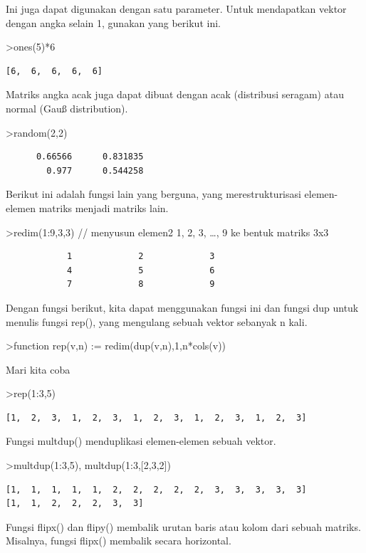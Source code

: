 \documentclass[
]{book}
\begin{document}
Ini juga dapat digunakan dengan satu parameter. Untuk mendapatkan vektor dengan angka selain 1, gunakan yang berikut ini.

\textgreater ones(5)*6

\begin{verbatim}
[6,  6,  6,  6,  6]
\end{verbatim}

Matriks angka acak juga dapat dibuat dengan acak (distribusi seragam) atau normal (Gauß distribution).

\textgreater random(2,2)

\begin{verbatim}
      0.66566      0.831835 
        0.977      0.544258 
\end{verbatim}

Berikut ini adalah fungsi lain yang berguna, yang merestrukturisasi elemen-elemen matriks menjadi matriks lain.

\textgreater redim(1:9,3,3) // menyusun elemen2 1, 2, 3, \ldots, 9 ke bentuk matriks 3x3

\begin{verbatim}
            1             2             3 
            4             5             6 
            7             8             9 
\end{verbatim}

Dengan fungsi berikut, kita dapat menggunakan fungsi ini dan fungsi dup untuk menulis fungsi rep(), yang mengulang sebuah vektor sebanyak n kali.

\textgreater function rep(v,n) := redim(dup(v,n),1,n*cols(v))

Mari kita coba

\textgreater rep(1:3,5)

\begin{verbatim}
[1,  2,  3,  1,  2,  3,  1,  2,  3,  1,  2,  3,  1,  2,  3]
\end{verbatim}

Fungsi multdup() menduplikasi elemen-elemen sebuah vektor.

\textgreater multdup(1:3,5), multdup(1:3,{[}2,3,2{]})

\begin{verbatim}
[1,  1,  1,  1,  1,  2,  2,  2,  2,  2,  3,  3,  3,  3,  3]
[1,  1,  2,  2,  2,  3,  3]
\end{verbatim}

Fungsi flipx() dan flipy() membalik urutan baris atau kolom dari sebuah matriks. Misalnya, fungsi flipx() membalik secara horizontal.
\end{document}
